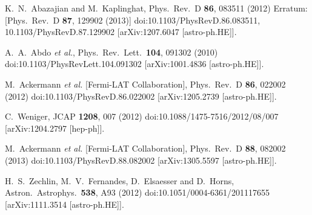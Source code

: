\documentclass[12pt,prd,showpacs,amsmath,amssymb,aps,floats,floatfix,nofootinbib]{revtex4-1}
\begin{document}
\begin{thebibliography}{99}
  K.~N.~Abazajian and M.~Kaplinghat,
  Phys.\ Rev.\ D {\bf 86}, 083511 (2012)
  Erratum: [Phys.\ Rev.\ D {\bf 87}, 129902 (2013)]
  doi:10.1103/PhysRevD.86.083511, 10.1103/PhysRevD.87.129902
  [arXiv:1207.6047 [astro-ph.HE]].

  A.~A.~Abdo {\it et al.},
  Phys.\ Rev.\ Lett.\  {\bf 104}, 091302 (2010)
  doi:10.1103/PhysRevLett.104.091302
  [arXiv:1001.4836 [astro-ph.HE]].

  M.~Ackermann {\it et al.} [Fermi-LAT Collaboration],
  Phys.\ Rev.\ D {\bf 86}, 022002 (2012)
  doi:10.1103/PhysRevD.86.022002
  [arXiv:1205.2739 [astro-ph.HE]].

  C.~Weniger,
  JCAP {\bf 1208}, 007 (2012)
  doi:10.1088/1475-7516/2012/08/007
  [arXiv:1204.2797 [hep-ph]].

  M.~Ackermann {\it et al.} [Fermi-LAT Collaboration],
  Phys.\ Rev.\ D {\bf 88}, 082002 (2013)
  doi:10.1103/PhysRevD.88.082002
  [arXiv:1305.5597 [astro-ph.HE]].

  H.~S.~Zechlin, M.~V.~Fernandes, D.~Elsaesser and D.~Horns,
  Astron.\ Astrophys.\  {\bf 538}, A93 (2012)
  doi:10.1051/0004-6361/201117655
  [arXiv:1111.3514 [astro-ph.HE]].


\end{thebibliography}
\end{document}
